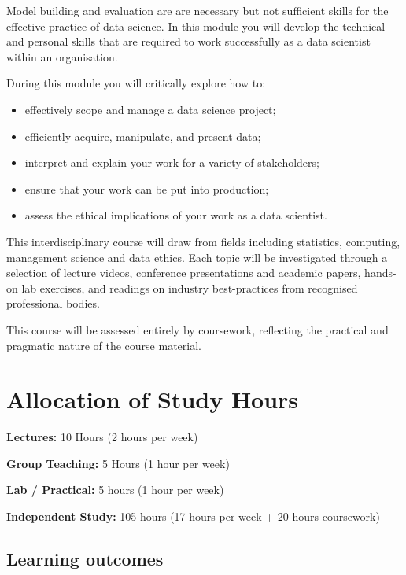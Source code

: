 \documentclass[
  12pt,
]{book}
\providecommand{\tightlist}{%
  \setlength{\itemsep}{0pt}\setlength{\parskip}{0pt}}
\theoremstyle{definition}
\theoremstyle{definition}
\theoremstyle{definition}
\theoremstyle{definition}
\theoremstyle{remark}
\begin{document}
Model building and evaluation are are necessary but not sufficient skills for the effective practice of data science. In this module you will develop the technical and personal skills that are required to work successfully as a data scientist within an organisation.

During this module you will critically explore how to:

\begin{itemize}
\tightlist
\item
  effectively scope and manage a data science project;
\item
  efficiently acquire, manipulate, and present data;
\item
  interpret and explain your work for a variety of stakeholders;
\item
  ensure that your work can be put into production;
\item
  assess the ethical implications of your work as a data scientist.
\end{itemize}

This interdisciplinary course will draw from fields including statistics, computing, management science and data ethics. Each topic will be investigated through a selection of lecture videos, conference presentations and academic papers, hands-on lab exercises, and readings on industry best-practices from recognised professional bodies.

This course will be assessed entirely by coursework, reflecting the practical and pragmatic nature of the course material.

\hypertarget{allocation-of-study-hours}{%
\section{Allocation of Study Hours}\label{allocation-of-study-hours}}

\textbf{Lectures:} 10 Hours (2 hours per week)

\textbf{Group Teaching:} 5 Hours (1 hour per week)

\textbf{Lab / Practical:} 5 hours (1 hour per week)

\textbf{Independent Study:} 105 hours (17 hours per week + 20 hours coursework)

\hypertarget{learning-outcomes}{%
\subsection{Learning outcomes}\label{learning-outcomes}}
\end{document}

